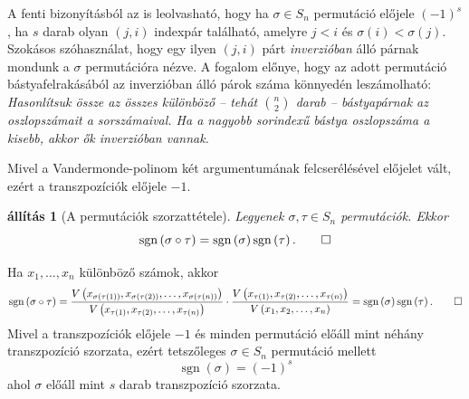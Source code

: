\documentclass[a4paper, showtrims]{memoir}
\makeatletter
\renewenvironment{proof}[1][\proofname]
    {\par\pushQED{\qed}%
    \normalfont \topsep6\p@\@plus6\p@\relax
    \trivlist
    \item[\hskip\labelsep
        \itshape
    #1\@addpunct{:}]\ignorespaces}
    {\popQED\endtrivlist\@endpefalse}
\theoremstyle{plain}
\newtheorem{proposition}{állítás}[chapter]
\theoremstyle{remark}
\theoremstyle{definition}
\DeclareMathOperator{\sgn}{sgn}
\makeatother
\begin{document}
    A fenti bizonyításból az is leolvasható, 
    hogy ha $\sigma\in S_n$ permutáció előjele $\left( -1 \right)^s$,
    ha $s$ darab olyan $\left( j,i \right)$ indexpár található,
    amelyre $j<i$ és $\sigma(i)<\sigma(j)$.
    Szokásos szóhasználat, 
    hogy egy ilyen $\left( j,i \right)$ párt \emph{inverzióban} álló párnak mondunk a $\sigma$ permutációra nézve.
    A fogalom előnye, hogy az adott permutáció bástyafelrakásából az inverzióban álló párok száma könnyedén leszámolható:
\emph{
	Hasonlítsuk össze az összes különböző -- tehát $\binom{n}{2}$ darab --
	bástyapárnak az oszlopszámait a sorszámaival.
	Ha a nagyobb sorindexű bástya oszlopszáma a kisebb, akkor ők inverzióban vannak.
}

    Mivel a Vandermonde-polinom két argumentumának felcserélésével előjelet vált,
    ezért a transzpozíciók előjele $-1$.
    \begin{proposition}[A permutációk szorzattétele]
        Legyenek $\sigma,\tau\in S_n$ permutációk. 
        Ekkor 
        \[
            \sgn\left( \sigma\circ\tau \right)=\sgn\left( \sigma \right)\sgn\left( \tau \right).\qedhere
        \]
    \end{proposition}
    \begin{proof}
        Ha $x_1,\dots,x_n$ különböző számok, akkor
        \[
            \sgn\left( \sigma\circ\tau \right)
            =
            \frac{V\left( x_{\sigma\left( \tau\left( 1 \right) \right)},
                          x_{\sigma\left( \tau\left( 2 \right) \right)},\ldots,
                          x_{\sigma\left( \tau\left( n \right) \right)}
                    \right)}{%
                  V\left( x_{\tau\left( 1 \right)},
                          x_{\tau\left( 2 \right)},\ldots,
                          x_{\tau\left( n \right)}
                    \right)
                    }
            \cdot
            \frac{
                  V\left( x_{\tau\left( 1 \right)},
                          x_{\tau\left( 2 \right)},\ldots,
                          x_{\tau\left( n \right)}
                    \right)
            }{V\left( x_1,x_2,\dots,x_n \right)}
            =
            \sgn\left( \sigma \right)\sgn\left( \tau \right).\qedhere
        \]
    \end{proof}
    Mivel a transzpozíciók előjele $-1$ és minden permutáció előáll mint néhány transzpozíció szorzata,
    ezért tetszőleges $\sigma\in S_n$ permutáció mellett
    \[
        \sgn\left( \sigma \right)=\left( -1 \right)^s
    \]
    ahol $\sigma$ előáll mint $s$ darab transzpozíció szorzata.
\end{document}

